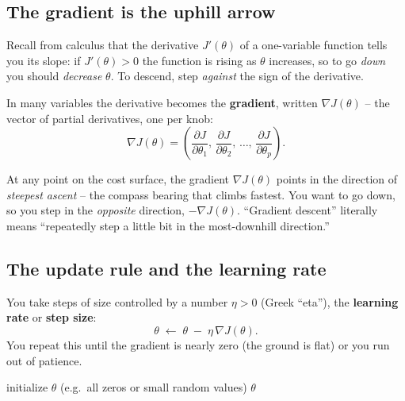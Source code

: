 \subsection{The gradient is the uphill arrow}

Recall from calculus that the derivative $J'(\theta)$ of a one-variable function
tells you its slope: if $J'(\theta) > 0$ the function is rising as $\theta$
increases, so to go \emph{down} you should \emph{decrease} $\theta$. To descend,
step \emph{against} the sign of the derivative.

In many variables the derivative becomes the \textbf{gradient}, written
$\nabla J(\theta)$ -- the vector of partial derivatives, one per knob:
\[
  \nabla J(\theta) =
  \left(\frac{\partial J}{\partial \theta_1},\,
        \frac{\partial J}{\partial \theta_2},\,\dots,\,
        \frac{\partial J}{\partial \theta_p}\right).
\]

\begin{intuitionbox}
At any point on the cost surface, the gradient $\nabla J(\theta)$ points in the
direction of \emph{steepest ascent} -- the compass bearing that climbs fastest.
You want to go down, so you step in the \emph{opposite} direction,
$-\nabla J(\theta)$. ``Gradient descent'' literally
means ``repeatedly step a little bit in the most-downhill direction.''
\end{intuitionbox}

\subsection{The update rule and the learning rate}

You take steps of size controlled by a number $\eta > 0$ (Greek ``eta''), the
\textbf{learning rate} or \textbf{step size}:
\[
  \theta \;\leftarrow\; \theta \;-\; \eta\,\nabla J(\theta).
\]
You repeat this until the gradient is nearly zero (the ground is flat) or you run
out of patience.

\begin{algorithm}[H]
\caption{\textsc{Gradient-Descent}}
initialize $\theta$ (e.g.\ all zeros or small random values)\;
\Return $\theta$\;
\end{algorithm}

